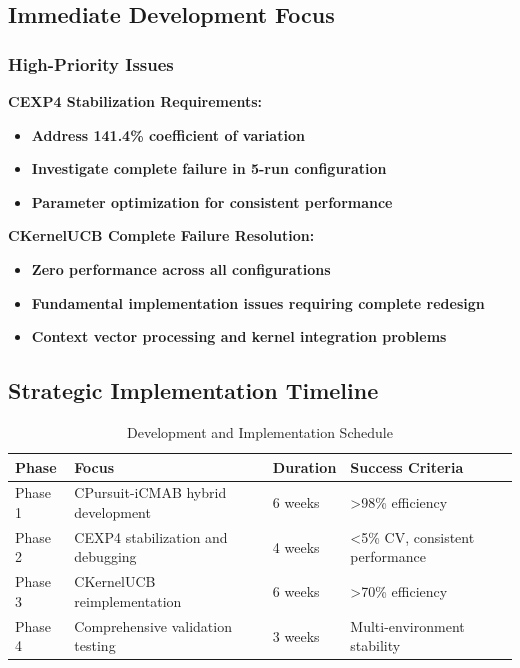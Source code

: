 \documentclass[12pt,a4paper]{article}
\newcommand{\critical}[1]{\textcolor{criticalcolor}{\textbf{#1}}}
\begin{document}
\subsection{Immediate Development Focus}

\subsubsection{High-Priority Issues}

\textbf{CEXP4 Stabilization Requirements:}
\begin{itemize}
\item \critical{Address 141.4\% coefficient of variation}
\item \critical{Investigate complete failure in 5-run configuration}
\item \critical{Parameter optimization for consistent performance}
\end{itemize}

\textbf{CKernelUCB Complete Failure Resolution:}
\begin{itemize}
\item \critical{Zero performance across all configurations}
\item \critical{Fundamental implementation issues requiring complete redesign}
\item \critical{Context vector processing and kernel integration problems}
\end{itemize}

\subsection{Strategic Implementation Timeline}

\begin{table}[H]
\centering
\caption{Development and Implementation Schedule}
\begin{tabular}{|l|l|l|l|}
\hline
\textbf{Phase} & \textbf{Focus} & \textbf{Duration} & \textbf{Success Criteria} \\
\hline
\hline
Phase 1 & CPursuit-iCMAB hybrid development & 6 weeks & >98\% efficiency \\
Phase 2 & CEXP4 stabilization and debugging & 4 weeks & <5\% CV, consistent performance \\
Phase 3 & CKernelUCB reimplementation & 6 weeks & >70\% efficiency \\
Phase 4 & Comprehensive validation testing & 3 weeks & Multi-environment stability \\
\hline
\end{tabular}
\end{table}
\end{document}
